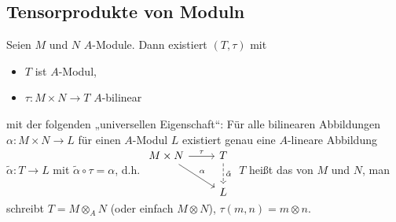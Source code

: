 \subsection{Tensorprodukte von Moduln}

\begin{st}
    Seien $M$ und $N$ $A$-Module.
    Dann existiert $(T, \tau)$ mit
    \begin{itemize}
        \item
            $T$ ist $A$-Modul,
        \item
            $\tau: M \times N \to T$ $A$-bilinear
    \end{itemize}
    mit der folgenden „universellen Eigenschaft“:
    Für alle bilinearen Abbildungen $\alpha: M \times N \to L$ für einen $A$-Modul $L$ existiert genau eine $A$-lineare Abbildung $\tilde \alpha: T \to L$ mit $\tilde \alpha \circ \tau = \alpha$, d.h.
    \begin{math}
        \begin{tikzcd}
            M \times N \ar[r,"\tau"] \ar[dr,"\alpha"] & T \ar[d,dashed,"\tilde \alpha"] \\
            & L
        \end{tikzcd}
    \end{math}
    $T$ heißt das  von $M$ und $N$, man schreibt $T = M \otimes_A N$ (oder einfach $M \otimes N$), $\tau(m,n) = m \otimes n$.


\end{st}
